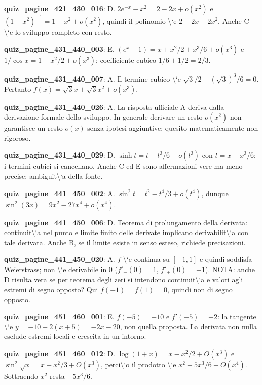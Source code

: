 \documentclass[11pt,a4paper]{article}
\newcounter{quiz}
\begin{document}
\noindent\textbf{quiz\_pagine\_421\_430\_016}: D. $2e^{-x}-x^2=2-2x+o(x^2)$ e $(1+x^2)^{-1}=1-x^2+o(x^2)$, quindi il polinomio \textbackslash{}`e $2-2x-2x^2$. Anche C \textbackslash{}`e lo sviluppo completo con resto.\par\medskip
\noindent\textbf{quiz\_pagine\_431\_440\_003}: E. $(e^x-1)=x+x^2/2+x^3/6+o(x^3)$ e $1/\cos x=1+x^2/2+o(x^3)$; coefficiente cubico $1/6+1/2=2/3$.\par\medskip
\noindent\textbf{quiz\_pagine\_431\_440\_007}: A. Il termine cubico \textbackslash{}`e $\sqrt3/2-(\sqrt3)^3/6=0$. Pertanto $f(x)=\sqrt3x+\sqrt3x^2+o(x^3)$.\par\medskip
\noindent\textbf{quiz\_pagine\_431\_440\_026}: A. La risposta ufficiale A deriva dalla derivazione formale dello sviluppo. In generale derivare un resto $o(x^2)$ non garantisce un resto $o(x)$ senza ipotesi aggiuntive: quesito matematicamente non rigoroso.\par\medskip
\noindent\textbf{quiz\_pagine\_431\_440\_029}: D. $\sinh t=t+t^3/6+o(t^3)$ con $t=x-x^3/6$; i termini cubici si cancellano. Anche C ed E sono affermazioni vere ma meno precise: ambiguit\textbackslash{}`a della fonte.\par\medskip
\noindent\textbf{quiz\_pagine\_441\_450\_002}: A. $\sin^2 t=t^2-t^4/3+o(t^4)$, dunque $\sin^2(3x)=9x^2-27x^4+o(x^4)$.\par\medskip
\noindent\textbf{quiz\_pagine\_441\_450\_006}: D. Teorema di prolungamento della derivata: continuit\textbackslash{}`a nel punto e limite finito delle derivate implicano derivabilit\textbackslash{}`a con tale derivata. Anche B, se il limite esiste in senso esteso, richiede precisazioni.\par\medskip
\noindent\textbf{quiz\_pagine\_441\_450\_020}: A. $f$ \textbackslash{}`e continua su $[-1,1]$ e quindi soddisfa Weierstrass; non \textbackslash{}`e derivabile in $0$ ($f\prime_-(0)=1$, $f\prime_+(0)=-1$). NOTA: anche D risulta vera se per teorema degli zeri si intendono continuit\textbackslash{}`a e valori agli estremi di segno opposto? Qui $f(-1)=f(1)=0$, quindi non di segno opposto.\par\medskip
\noindent\textbf{quiz\_pagine\_451\_460\_001}: E. $f(-5)=-10$ e $f\prime(-5)=-2$: la tangente \textbackslash{}`e $y=-10-2(x+5)=-2x-20$, non quella proposta. La derivata non nulla esclude estremi locali e crescita in un intorno.\par\medskip
\noindent\textbf{quiz\_pagine\_451\_460\_012}: D. $\log(1+x)=x-x^2/2+O(x^3)$ e $\sin^2\sqrt{x}=x-x^2/3+O(x^3)$, perci\textbackslash{}`o il prodotto \textbackslash{}`e $x^2-5x^3/6+O(x^4)$. Sottraendo $x^2$ resta $-5x^3/6$.\par\medskip
\end{document}
